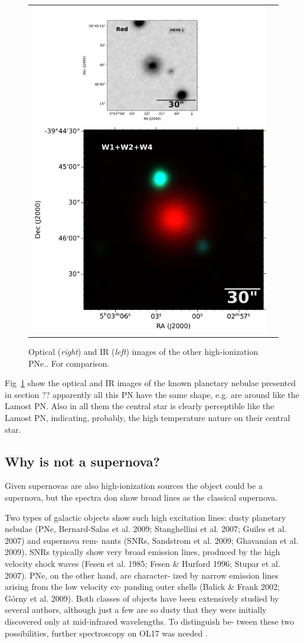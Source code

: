 \documentclass[fleqn,usenatbib]{mnras}
\begin{document}
{\begin{figure}
\begin{tabular}{l l}
\includegraphics[width=0.535\linewidth, trim=280 10 330 10, clip]{Figs/dss_search_red.pdf}
\includegraphics[width=0.47\linewidth, trim=58 0 0 0]{Figs/0754m394_ac51-w4-int-3_ra75.75721626934_dec-39.76236833917_asec150.000-421-RGB.pdf}\\

\end{tabular}  
  \caption{Optical (\textit{right}) and IR (\textit{left}) images of the other high-ionization PNe.. For comparison. } 
  \label{fig:images-known}
\end{figure}

Fig~\ref{fig:images-known} show the optical and IR images of the known planetary nebulae
presented in section ?? apparently all this PN have the same shape, e.g. are around like
the Lamost PN. Also in all them the central star is clearly perceptible like the Lamost PN,
indicating, probably, the high temperature nature on their central star.

\subsection{Why is not a supernova?}
\label{sec:snr}

Given supernovas are also high-ionization sources the object could be
a supernova, but the spectra don show broad lines as the classical supernova.

Two types of galactic objects show such high excitation
lines: dusty planetary nebulae (PNe, Bernard-Salas et al. 2009;
Stanghellini et al. 2007; Guiles et al. 2007) and supernova rem-
nants (SNRs, Sandstrom et al. 2009; Ghavamian et al. 2009).
SNRs typically show very broad emission lines, produced by the
high velocity shock waves (Fesen et al. 1985; Fesen & Hurford
1996; Stupar et al. 2007). PNe, on the other hand, are character-
ized by narrow emission lines arising from the low velocity ex-
panding outer shells (Balick & Frank 2002; Górny et al. 2009).
Both classes of objects have been extensively studied by several
authors, although just a few are so dusty that they were initially
discovered only at mid-infrared wavelengths. To distinguish be-
tween these two possibilities, further spectroscopy on OL17 was
needed \citep{Oliveira:2011}.

}
\end{document}
